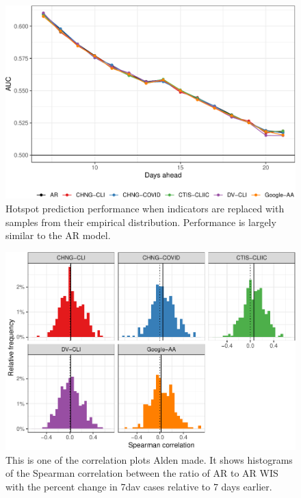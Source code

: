 \documentclass[9pt,twoside,lineno]{pnas-new}
\begin{document}
\clearpage

\begin{figure}

{\centering \includegraphics[width=\textwidth]{fig/hot-booted-1} 

}

\caption{Hotspot prediction performance when indicators are replaced with samples from their empirical distribution. Performance is largely similar to the AR model.}\label{fig:hot-booted}
\end{figure}

\clearpage

\begin{figure}

{\centering \includegraphics[width=\textwidth]{fig/cor-wis-ratio-1} 

}

\caption{This is one of the correlation plots Alden made. It shows histograms of the Spearman correlation between the ratio of AR to AR WIS with the percent change in 7dav cases relative to 7 days earlier.}\label{fig:cor-wis-ratio}
\end{figure}
\end{document}
